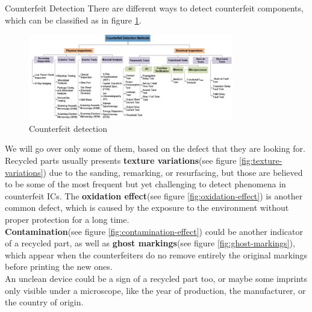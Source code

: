 \begin{section}{Counterfeit Detection}
  There are different ways to detect counterfeit components, which can be classified as in figure 
  \ref{fig:counterfeit-detection}.
  \begin{figure}[H]
    \centering
    \includegraphics[width=0.8\textwidth]{img/hardware/counterfeit detection.png}
    \caption{Counterfeit detection}
    \label{fig:counterfeit-detection}
  \end{figure}
  We will go over only some of them, based on the defect that they are looking for.\\
  Recycled parts usually presents \textbf{texture variations}(see figure
  \ref{fig:texture-variations}) due to the sanding, remarking, or resurfacing, but those are
  believed to be some of the most frequent but yet challenging to detect phenomena in counterfeit
  ICs. The \textbf{oxidation effect}(see figure \ref{fig:oxidation-effect}) is another common 
  defect, which is caused by the exposure to the environment without proper protection for a long
  time.\\
  \textbf{Contamination}(see figure \ref{fig:contamination-effect}) could be another indicator of a recycled
  part, as well as \textbf{ghost markings}(see figure \ref{fig:ghost-markings}), which appear when the
  counterfeiters do no remove entirely the original markings before printing the new ones.\\
  An unclean device could be a sign of a recycled part too, or maybe some imprints only visible
  under a microscope, like the year of production, the manufacturer, or the country of origin.


\end{section}
